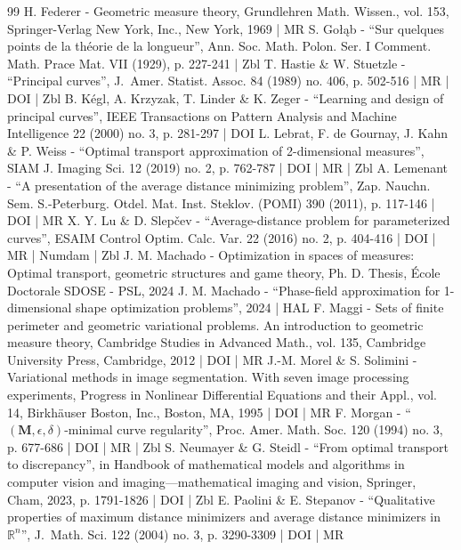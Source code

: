 \documentclass[10pt]{amsart}
\theoremstyle{definition}
\begin{document}
\begin{thebibliography}{99}
H. Federer - Geometric measure theory, Grundlehren Math. Wissen., vol. 153, Springer-Verlag New York, Inc., New York, 1969 | MR
S. Gołąb - “Sur quelques points de la théorie de la longueur”, Ann. Soc. Math. Polon. Ser. I Comment. Math. Prace Mat. VII (1929), p. 227-241 | Zbl
T. Hastie \& W. Stuetzle - “Principal curves”, J. Amer. Statist. Assoc. 84 (1989) no. 406, p. 502-516 | MR | DOI | Zbl
B. Kégl, A. Krzyzak, T. Linder \& K. Zeger - “Learning and design of principal curves”, IEEE Transactions on Pattern Analysis and Machine Intelligence 22 (2000) no. 3, p. 281-297 | DOI
L. Lebrat, F. de Gournay, J. Kahn \& P. Weiss - “Optimal transport approximation of 2-dimensional measures”, SIAM J. Imaging Sci. 12 (2019) no. 2, p. 762-787 | DOI | MR | Zbl
A. Lemenant - “A presentation of the average distance minimizing problem”, Zap. Nauchn. Sem. S.-Peterburg. Otdel. Mat. Inst. Steklov. (POMI) 390 (2011), p. 117-146 | DOI | MR
X. Y. Lu \& D. Slepčev - “Average-distance problem for parameterized curves”, ESAIM Control Optim. Calc. Var. 22 (2016) no. 2, p. 404-416 | DOI | MR | Numdam | Zbl
J. M. Machado - Optimization in spaces of measures: Optimal transport, geometric structures and game theory, Ph. D. Thesis, École Doctorale SDOSE - PSL, 2024
J. M. Machado - “Phase-field approximation for 1-dimensional shape optimization problems”, 2024 | HAL
F. Maggi - Sets of finite perimeter and geometric variational problems. An introduction to geometric measure theory, Cambridge Studies in Advanced Math., vol. 135, Cambridge University Press, Cambridge, 2012 | DOI | MR
J.-M. Morel \& S. Solimini - Variational methods in image segmentation. With seven image processing experiments, Progress in Nonlinear Differential Equations and their Appl., vol. 14, Birkhäuser Boston, Inc., Boston, MA, 1995 | DOI | MR
F. Morgan - “$({\mathbf{M}},\epsilon ,\delta )$-minimal curve regularity”, Proc. Amer. Math. Soc. 120 (1994) no. 3, p. 677-686 | DOI | MR | Zbl
S. Neumayer \& G. Steidl - “From optimal transport to discrepancy”, in Handbook of mathematical models and algorithms in computer vision and imaging—mathematical imaging and vision, Springer, Cham, 2023, p. 1791-1826 | DOI | Zbl
E. Paolini \& E. Stepanov - “Qualitative properties of maximum distance minimizers and average distance minimizers in ${\mathbb{R}}^n$”, J. Math. Sci. 122 (2004) no. 3, p. 3290-3309 | DOI | MR

\end{thebibliography}
\end{document}
